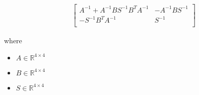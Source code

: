 \documentclass[12pt]{article}
\begin{document}
\begin{align*}
 & \begin{bmatrix}
\textit{A}^{-1} + \textit{A}^{-1}\textit{B}\textit{S}^{-1}\textit{B}^T\textit{A}^{-1} & -\textit{A}^{-1}\textit{B}\textit{S}^{-1}\\
-\textit{S}^{-1}\textit{B}^T\textit{A}^{-1} & \textit{S}^{-1}\\
\end{bmatrix}
\end{align*}

where
\begin{itemize}
\item $\textit{A} \in \mathbb{R}^{ 4 \times 4 }$
\item $\textit{B} \in \mathbb{R}^{ 4 \times 4 }$
\item $\textit{S} \in \mathbb{R}^{ 4 \times 4 }$
\end{itemize}
\end{document}

